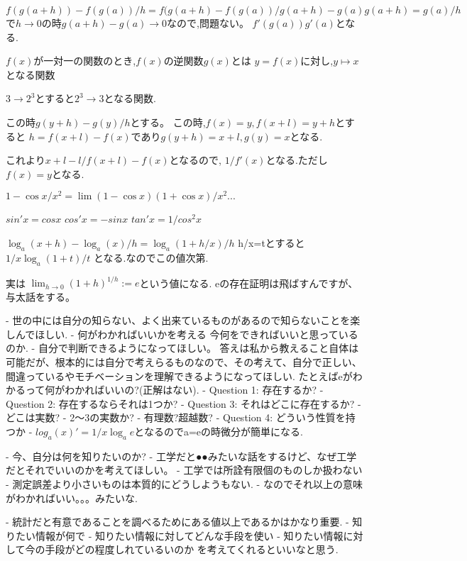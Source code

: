 \documentclass{ujarticle}
\begin{document}
\begin{thm}[合成関数の微分]
$f(g(a+h)) - f(g(a))/ h
= f(g(a+h)-f(g(a))/ g(a+h) - g(a) g(a+h) =g(a)/ h$
で$h \to 0$の時$g(a+h) - g(a) \to 0$なので,問題ない。
$f'(g(a)) g'(a)$となる.
\end{thm}


\begin{dfn}
$f(x)$が一対一の関数のとき,$f(x)$の逆関数$g(x)$とは
$y = f(x)$に対し,$y \mapsto x$となる関数
\end{dfn}

\begin{epl}[指数関数と対数関数]
$3 \to 2^3$とすると$2^3 \to 3$となる関数.

この時$g(y+h) - g(y)/h$とする。
この時,$f(x) = y,f(x+l) = y+h$とすると
$h = f(x+l) - f(x)$であり$g(y+h) = x +l,g(y) = x$となる.

これより$x+l - l /f(x+l) - f(x)$となるので,
$1/f'(x)$となる.ただし$f(x) = y$となる.
\end{epl}


\begin{prop}[三角関数の微分]
$1-\cos x/x^2 = \lim (1 - \cos x)(1 + \cos x)/x^2 ...$

$sin'x =cosx$
$cos'x = - sinx$
$tan'x = 1/ cos^2x$
\end{prop}

\begin{prop}[対数関数の微分]
$\log_a(x+h) - \log_a(x)/h = \log_a(1+h/x)/h$
h/x=tとすると $ 1/x \log_a(1+t)/t$
となる.なのでこの値次第.
\end{prop}

実は
$\lim_{h \to 0} (1 +h)^{1/h}:=e$という値になる.
eの存在証明は飛ばすんですが、与太話をする。

\begin{rem}
- 世の中には自分の知らない、よく出来ているものがあるので知らないことを楽しんでほしい.
- 何がわかればいいかを考える
  今何をできればいいと思っているのか.
- 自分で判断できるようになってほしい。
答えは私から教えること自体は可能だが、根本的には自分で考えらるものなので、その考えて、自分で正しい、間違っているやモチベーションを理解できるようになってほしい.
たとえばeがわかるって何がわかればいいの?(正解はない).
- Question 1: 存在するか?
- Question 2: 存在するならそれは1つか?
- Question 3: それはどこに存在するか?
  - どこは実数?
  - 2〜3の実数か?
  - 有理数?超越数?
- Question 4: どういう性質を持つか
  - $log_a(x)'=1/x \log_ae$となるのでa=eの時微分が簡単になる.

- 今、自分は何を知りたいのか?
  - 工学だと●●みたいな話をするけど、なぜ工学だとそれでいいのかを考えてほしい。
  - 工学では所詮有限個のものしか扱わない
  - 測定誤差より小さいものは本質的にどうしようもない.
  - なのでそれ以上の意味がわかればいい。。。みたいな.

- 統計だと有意であることを調べるためにある値以上であるかはかなり重要.
  - 知りたい情報が何で
  - 知りたい情報に対してどんな手段を使い
  - 知りたい情報に対して今の手段がどの程度しれているいのか
  を考えてくれるといいなと思う.
\end{rem}
\end{document}
